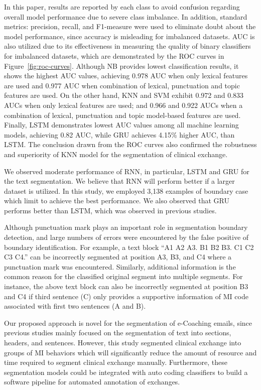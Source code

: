 \documentclass{amia}
\begin{document}
In this paper, results are reported by each class to avoid confusion regarding overall model performance due to severe class imbalance. In addition, standard metrics: precision, recall, and F1-measure were used to eliminate doubt about the model performance, since accuracy is misleading for imbalanced datasets. AUC is also utilized due to its effectiveness in measuring the quality of binary classifiers for imbalanced datasets\cite{hu2015kernelized}, which are demonstrated by the ROC curves in Figure~\ref{fig:roc-curves}. Although NB provides lowest classification results, it shows the highest AUC values, achieving 0.978 AUC when only lexical features are used and 0.977 AUC when combination of lexical, punctuation and topic features are used. On the other hand, KNN and SVM exhibit 0.972 and 0.833 AUCs when only lexical features are used; and 0.966 and 0.922 AUCs when a combination of lexical, punctuation and topic model-based features are used. Finally, LSTM demonstrates lowest AUC values among all machine learning models, achieving 0.82 AUC, while GRU achieves 4.15\% higher AUC, than LSTM. The conclusion drawn from the ROC curves also confirmed the robustness and superiority of KNN model for the segmentation of clinical exchange.      

We observed moderate performance of RNN, in particular, LSTM and GRU for the text segmentation. We believe that RNN will perform better if a larger dataset is utilized. In this study, we employed 3,138 examples of boundary case which limit to achieve the best performance. We also observed that GRU performs better than LSTM, which was observed in previous studies\cite{chung2014empirical}.

Although punctuation mark plays an important role in segmentation boundary detection, and large numbers of errors were encountered by the false positive of boundary identification. For example, a text block ``A1 A2 A3. B1 B2 B3. C1 C2 C3 C4.'' can be incorrectly segmented at position A3, B3, and C4 where a punctuation mark was encountered. Similarly, additional information is the common reason for the classified original segment into multiple segments. For instance, the above text block can also be incorrectly segmented at position B3 and C4 if third sentence (C) only provides a supportive information of MI code associated with first two sentences (A and B). 

Our proposed approach is novel for the segmentation of e-Coaching emails, since previous studies mainly focused on the segmentation of text into sections, headers, and sentences. However, this study segmented clinical exchange into groups of MI behaviors which will significantly reduce the amount of resource and time required to segment clinical exchange manually. Furthermore, these segmentation models could be integrated with auto coding classifiers to build a software pipeline for automated annotation of exchanges.
\end{document}
